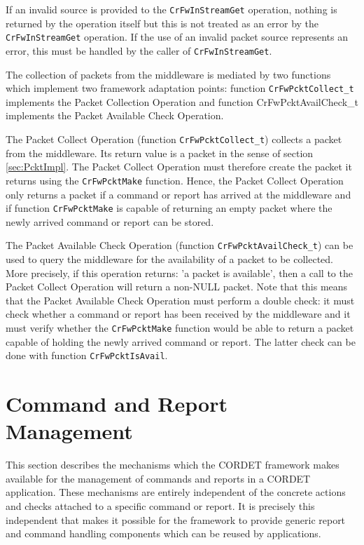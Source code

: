 \documentclass{pnp_article}
\begin{document}
If an invalid source is provided to the \texttt{CrFwInStreamGet} operation, nothing is returned by the operation itself but this is not treated as an error by the \texttt{CrFwInStreamGet} operation. If the use of an invalid packet source represents an error, this must be handled by the caller of \texttt{CrFwInStreamGet}. 

The collection of packets from the middleware is mediated by two functions which implement two framework adaptation points: function \texttt{CrFwPcktCollect\_t} implements the Packet Collection Operation and function CrFwPcktAvailCheck\_t implements the Packet Available Check Operation. 

The Packet Collect Operation (function \texttt{CrFwPcktCollect\_t}) collects a packet from the middleware. Its return value is a packet in the sense of section \ref{sec:PcktImpl}. The Packet Collect Operation must therefore create the packet it returns using the \texttt{CrFwPcktMake} function. Hence, the Packet Collect Operation only returns a packet if a command or report has arrived at the middleware and if function \texttt{CrFwPcktMake} is capable of returning an empty packet where the newly arrived command or report can be stored. 

The Packet Available Check Operation (function \texttt{CrFwPcktAvailCheck\_t}) can be used to query the middleware for the availability of a packet to be collected. More precisely, if this operation returns: 'a packet is available', then a call to the Packet Collect Operation will return a non-NULL packet. Note that this means that the Packet Available Check Operation must perform a double check: it must check whether a command or report has been received by the middleware and it must verify whether the \texttt{CrFwPcktMake} function would be able to return a packet capable of holding the newly arrived command or report. The latter check can be done with function \texttt{CrFwPcktIsAvail}.


\section{Command and Report Management}\label{sec:CmdAndRepManagement}
This section describes the mechanisms which the CORDET framework makes available for the management of commands and reports in a CORDET application. These mechanisms are entirely independent of the concrete actions and checks attached to a specific command or report. It is precisely this independent that makes it possible for the framework to provide generic report and command handling components which can be reused by applications.
\end{document}
